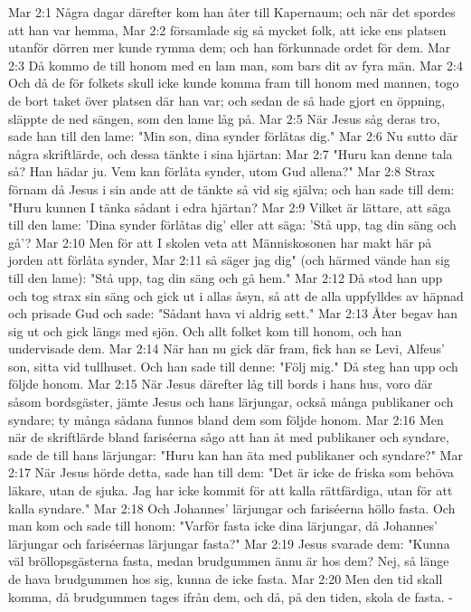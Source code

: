 Mar 2:1  Några dagar därefter kom han åter till Kapernaum; och när det spordes att han var hemma,
Mar 2:2  församlade sig så mycket folk, att icke ens platsen utanför dörren mer kunde rymma dem; och han förkunnade ordet för dem.
Mar 2:3  Då kommo de till honom med en lam man, som bars dit av fyra män.
Mar 2:4  Och då de för folkets skull icke kunde komma fram till honom med mannen, togo de bort taket över platsen där han var; och sedan de så hade gjort en öppning, släppte de ned sängen, som den lame låg på.
Mar 2:5  När Jesus såg deras tro, sade han till den lame: "Min son, dina synder förlåtas dig."
Mar 2:6  Nu sutto där några skriftlärde, och dessa tänkte i sina hjärtan:
Mar 2:7  "Huru kan denne tala så? Han hädar ju. Vem kan förlåta synder, utom Gud allena?"
Mar 2:8  Strax förnam då Jesus i sin ande att de tänkte så vid sig själva; och han sade till dem: "Huru kunnen I tänka sådant i edra hjärtan?
Mar 2:9  Vilket är lättare, att säga till den lame: 'Dina synder förlåtas dig' eller att säga: 'Stå upp, tag din säng och gå'?
Mar 2:10  Men för att I skolen veta att Människosonen har makt här på jorden att förlåta synder,
Mar 2:11  så säger jag dig" (och härmed vände han sig till den lame): "Stå upp, tag din säng och gå hem."
Mar 2:12  Då stod han upp och tog strax sin säng och gick ut i allas åsyn, så att de alla uppfylldes av häpnad och prisade Gud och sade: "Sådant hava vi aldrig sett."
Mar 2:13  Åter begav han sig ut och gick längs med sjön. Och allt folket kom till honom, och han undervisade dem.
Mar 2:14  När han nu gick där fram, fick han se Levi, Alfeus' son, sitta vid tullhuset. Och han sade till denne: "Följ mig." Då steg han upp och följde honom.
Mar 2:15  När Jesus därefter låg till bords i hans hus, voro där såsom bordsgäster, jämte Jesus och hans lärjungar, också många publikaner och syndare; ty många sådana funnos bland dem som följde honom.
Mar 2:16  Men när de skriftlärde bland fariséerna sågo att han åt med publikaner och syndare, sade de till hans lärjungar: "Huru kan han äta med publikaner och syndare?"
Mar 2:17  När Jesus hörde detta, sade han till dem: "Det är icke de friska som behöva läkare, utan de sjuka. Jag har icke kommit för att kalla rättfärdiga, utan för att kalla syndare."
Mar 2:18  Och Johannes' lärjungar och fariséerna höllo fasta. Och man kom och sade till honom: "Varför fasta icke dina lärjungar, då Johannes' lärjungar och fariséernas lärjungar fasta?"
Mar 2:19  Jesus svarade dem: "Kunna väl bröllopsgästerna fasta, medan brudgummen ännu är hos dem? Nej, så länge de hava brudgummen hos sig, kunna de icke fasta.
Mar 2:20  Men den tid skall komma, då brudgummen tages ifrån dem, och då, på den tiden, skola de fasta. -
